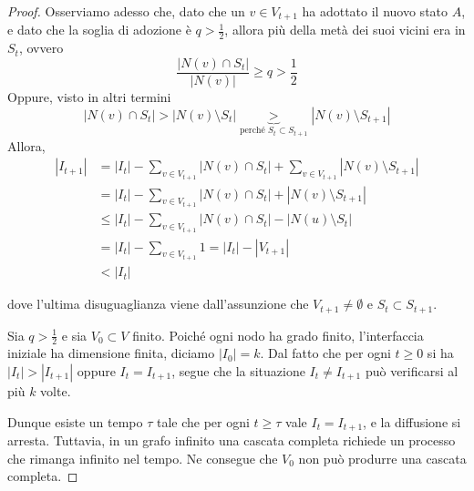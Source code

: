 \begin{proof}
    Osserviamo adesso che, dato che un $v \in V_{t+1}$ ha adottato il nuovo stato $A$, e dato che la soglia di adozione è $q > \frac{1}{2}$, allora più della metà dei suoi vicini era in $S_t$, ovvero 
    \[
    \frac{| N(v) \cap S_t |}{| N(v) |} \geq q > \frac{1}{2}
    \]
    Oppure, visto in altri termini 
    \[
    | N(v) \cap S_t | > | N(v) \setminus S_t | \underbrace{>}_{\text{perché }S_t \subset S_{t+1}} | N(v) \setminus S_{t+1} |
    \]
    Allora, 
    \begin{align*}
        |I_{t+1}| &= |I_t| - \sum_{v \in V_{t+1}} |N(v) \cap S_t| + \sum_{v \in V_{t+1}} |N(v) \setminus S_{t+1}| \\
        &= |I_t| -  \sum_{v \in V_{t+1}} |N(v) \cap S_t| + |N(v) \setminus S_{t+1}| \\
        &\leq |I_t| - \sum_{v \in V_{t+1}} |N(v) \cap S_t| - |N(u) \setminus S_t|\\
        &= | I_t | - \sum_{v \in V_{t+1}} 1 = | I_t | - | V_{t+1} | \\ 
        &< | I_t |
    \end{align*}

dove l'ultima disuguaglianza viene dall'assunzione che $V_{t+1} \neq \emptyset$ e $S_t \subset S_{t+1}$.

Sia $q>\tfrac12$ e sia $V_0\subset V$ finito. Poiché ogni nodo ha grado finito, 
l'interfaccia iniziale ha dimensione finita, diciamo $|I_0|=k$. 
Dal fatto che per ogni $t\ge0$ si ha $|I_t|>|I_{t+1}|$ oppure $I_t=I_{t+1}$, 
segue che la situazione $I_t\neq I_{t+1}$ può verificarsi al più $k$ volte. 

Dunque esiste un tempo $\tau$ tale che per ogni $t\ge \tau$ vale $I_t=I_{t+1}$, 
e la diffusione si arresta. 
Tuttavia, in un grafo infinito una cascata completa richiede un processo che 
rimanga infinito nel tempo. Ne consegue che $V_0$ non può produrre 
una cascata completa.
\end{proof} 



